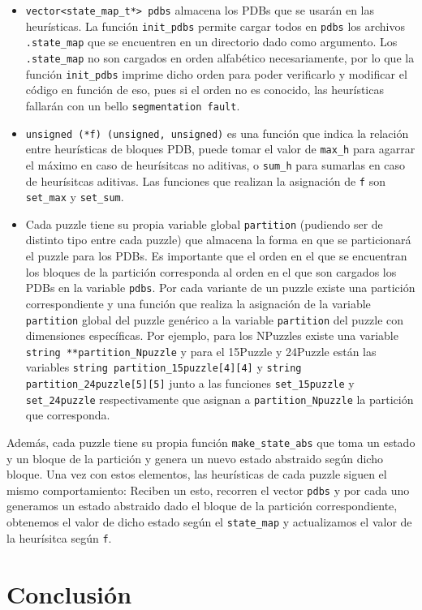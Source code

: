 \documentclass[a4paper,10pt]{article}
\begin{document}
    \begin{itemize}
      \item \verb|vector<state_map_t*> pdbs| almacena los PDBs que se usar\'an en las 
      heur\'isticas. La funci\'on \verb|init_pdbs| permite cargar todos en \verb|pdbs|
      los archivos \verb|.state_map| que se encuentren en un directorio dado como 
      argumento. Los \verb|.state_map| no son cargados en orden alfab\'etico 
      necesariamente, por lo que la funci\'on \verb|init_pdbs| imprime dicho orden 
      para poder verificarlo y modificar el c\'odigo en funci\'on de eso, pues si el 
      orden no es conocido, las heur\'isticas fallar\'an con un bello 
      \verb|segmentation fault|.

      \item \verb|unsigned (*f) (unsigned, unsigned)| es una funci\'on que indica la 
      relaci\'on entre heur\'isticas de bloques PDB, puede tomar el valor de 
      \verb|max_h| para agarrar el m\'aximo en caso de heur\'isitcas no aditivas, o 
      \verb|sum_h| para sumarlas en caso de heur\'isitcas aditivas. Las funciones que 
      realizan la asignaci\'on de \verb|f| son \verb|set_max| y \verb|set_sum|.

      \item Cada puzzle tiene su propia variable global \verb|partition| (pudiendo 
      ser de distinto tipo entre cada puzzle) que almacena la forma en que se 
      particionar\'a el puzzle para los PDBs. Es importante que el orden en el que 
      se encuentran los bloques de la partici\'on corresponda al orden en el que son 
      cargados los PDBs en la variable \verb|pdbs|. Por cada variante de un puzzle 
      existe una partici\'on correspondiente y una funci\'on que realiza la 
      asignaci\'on de la variable \verb|partition| global del puzzle gen\'erico a 
      la variable \verb|partition| del puzzle con dimensiones espec\'ificas. Por 
      ejemplo, para los NPuzzles existe una variable \verb|string **partition_Npuzzle|
      y para el 15Puzzle y 24Puzzle est\'an las variables 
      \verb|string partition_15puzzle[4][4]| y \verb|string partition_24puzzle[5][5]|
      junto a las funciones \verb|set_15puzzle| y \verb|set_24puzzle| respectivamente 
      que asignan a \verb|partition_Npuzzle| la partici\'on que corresponda.
    \end{itemize}

    Adem\'as, cada puzzle tiene su propia funci\'on \verb|make_state_abs| que toma un 
    estado y un bloque de la partici\'on y genera un nuevo estado abstraido seg\'un 
    dicho bloque. Una vez con estos elementos, las heur\'isticas de cada puzzle siguen 
    el mismo comportamiento: Reciben un esto, recorren el vector \verb|pdbs| y por cada 
    uno generamos un estado abstraido dado el bloque de la partici\'on correspondiente, 
    obtenemos el valor de dicho estado seg\'un el \verb|state_map| y actualizamos el 
    valor de la heur\'isitca seg\'un \verb|f|. 
\section{Conclusi\'on}
\end{document}
